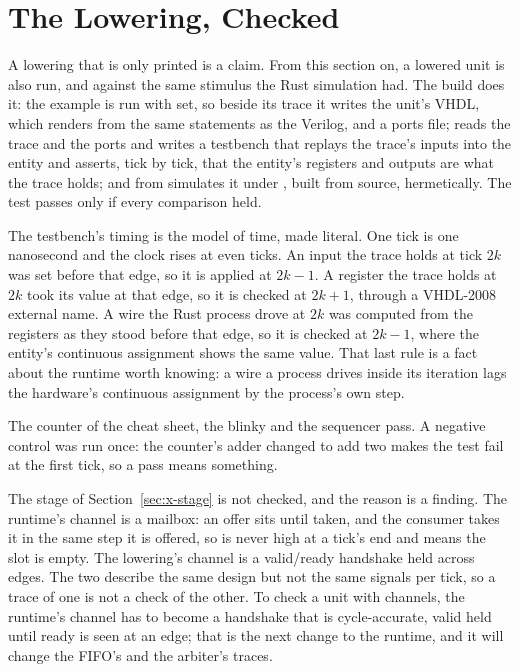 \section{The Lowering, Checked}
\label{sec:x-checked}

A lowering that is only printed is a claim. From this section on, a
lowered unit is also run, and against the same stimulus the Rust
simulation had. The build does it: the example is run with
 set, so beside its trace it writes the unit's VHDL,
which \code{\#[lower]} renders from the same statements as the
Verilog, and a ports file;  reads the trace and
the ports and writes a testbench that replays the trace's inputs into
the entity and asserts, tick by tick, that the entity's registers and
outputs are what the trace holds; and  from
 simulates it under , built from source,
hermetically. The test passes only if every comparison held.

The testbench's timing is the model of time, made literal. One tick is
one nanosecond and the clock rises at even ticks. An input the trace
holds at tick $2k$ was set before that edge, so it is applied at
$2k-1$. A register the trace holds at $2k$ took its value at that
edge, so it is checked at $2k+1$, through a VHDL-2008 external name.
A wire the Rust process drove at $2k$ was computed from the registers
as they stood before that edge, so it is checked at $2k-1$, where the
entity's continuous assignment shows the same value. That last rule
is a fact about the runtime worth knowing: a wire a process drives
inside its iteration lags the hardware's continuous assignment by the
process's own step.

The counter of the cheat sheet, the blinky and the sequencer pass.
A negative control was run once: the counter's adder changed to add
two makes the test fail at the first tick, so a pass means something.

The stage of Section~\ref{sec:x-stage} is not checked, and the reason
is a finding. The runtime's channel is a mailbox: an offer sits until
taken, and the consumer takes it in the same step it is offered, so
 is never high at a tick's end and  means the
slot is empty. The lowering's channel is a valid/ready handshake held
across edges. The two describe the same design but not the same
signals per tick, so a trace of one is not a check of the other. To
check a unit with channels, the runtime's channel has to become a
handshake that is cycle-accurate, valid held until ready is seen at an
edge; that is the next change to the runtime, and it will change the
FIFO's and the arbiter's traces.
